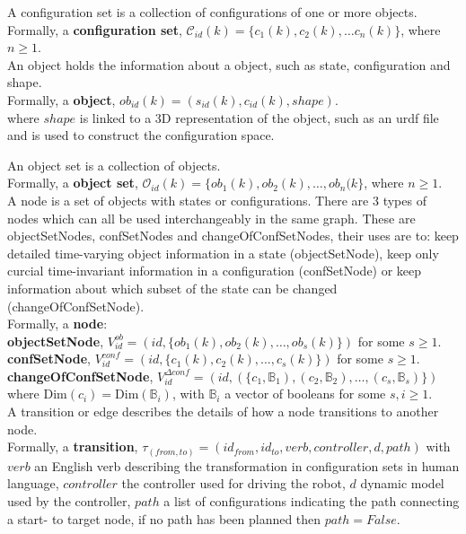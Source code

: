 A configuration set is a collection of configurations of one or more objects. \\
Formally, a \textbf{configuration set}, $\mathcal{C}_{id}(k) = \{c_1(k), c_2(k), \dots c_n(k)\}$, where $n \geq 1$. \\

An object holds the information about a object, such as state, configuration and shape.\\
Formally, a \textbf{object},  $ob_{id}(k) = (s_{id}(k), c_{id}(k), shape)$.\\
where $shape$ is linked to a 3D representation of the object, such as an urdf file and is used to construct the configuration space. 

An object set is a collection of objects.\\
Formally, a \textbf{object set}, $\mathcal{O}_{id}(k) = \{ob_1(k), ob_2(k), \dots, ob_n(k\}$, where $n \geq 1$. \\

A node is a set of objects with states or configurations. There are 3 types of nodes which can all be used interchangeably in the same graph. These are objectSetNodes, confSetNodes and changeOfConfSetNodes, their uses are to: keep detailed time-varying object information in a state (objectSetNode), keep only curcial time-invariant information in a configuration (confSetNode) or keep information about which subset of the state can be changed (changeOfConfSetNode).\\ 
Formally, a \textbf{node}:\\

\textbf{objectSetNode}, $V^{ob}_{id} =(id, \{ob_1(k), ob_2(k), \dots, ob_s(k)\})$ for some $s \geq 1$.\\

\textbf{confSetNode}, $V^{conf}_{id}= (id, \{c_1(k), c_2(k), \dots, c_s(k)\})$ for some $s \geq 1$.\\

\textbf{changeOfConfSetNode}, $V^{\Delta conf}_{id} = (id, (\{c_1, \mathbb{B}_1),(c_2, \mathbb{B}_2),\dots, (c_s, \mathbb{B}_s)\})$ where $\textrm{Dim}(c_{i})=\textrm{Dim}(\mathbb{B}_i)$, with $\mathbb{B}_i$ a vector of booleans for some $s,i \geq 1$.\\

A transition or edge describes the details of how a node transitions to another node.\\
Formally, a \textbf{transition}, $\tau_{(from, to)} = (id_{from}, id_{to}, verb, controller, d, path)$ with $verb$ an English verb describing the transformation in configuration sets in human language, $controller$ the controller used for driving the robot, $d$ dynamic model used by the controller, $path$ a list of configurations indicating the path connecting a start- to target node, if no path has been planned then $path = False$.\\

